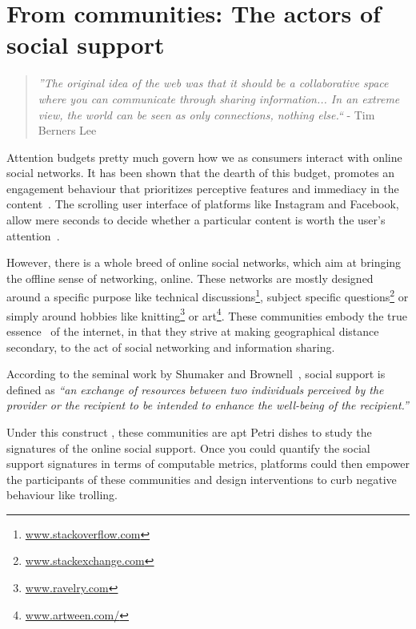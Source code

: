 
\chapter{From communities: The actors of social support }

\label{chap:Utility_support}
\graphicspath{{Chapter2/plots/} {Chapter2/plots}}
\begin{quote}
    \textit{''The original idea of the web was that it should be a collaborative space where you can communicate through sharing information... In an extreme view, the world can be seen as only connections, nothing else.``} - Tim Berners Lee\cite{berners2001weaving} 
\end{quote}
Attention budgets pretty much govern how we as consumers interact with online social networks. It has been shown that the dearth of this budget, promotes an engagement behaviour that prioritizes perceptive features and immediacy in the content~\cite{joglekar2017like}. The scrolling user interface of platforms like Instagram and Facebook, allow mere seconds to decide whether a particular content is worth the user's attention~\cite{eikelboom2017irresistible}. 

However, there is a whole breed of online social networks, which aim at bringing the offline sense of networking, online. These networks are mostly designed around a specific purpose like technical discussions\footnote{\url{www.stackoverflow.com}}, subject specific questions\footnote{\url{www.stackexchange.com}} or simply around hobbies like knitting\footnote{\url{www.ravelry.com}} or art\footnote{\url{www.artween.com/}}. These communities embody the true essence~\cite{berners2001weaving} of the internet, in that they strive at making geographical distance secondary, to the act of social networking and information sharing.
\begin{definition}
    According to the seminal work by Shumaker and Brownell~\cite{shumaker1984toward}, social support is defined as \textsl{``an exchange of resources between two individuals perceived by the provider or the recipient to be intended to enhance the well-being of the recipient.''}
    \label{def:support}
\end{definition}

Under this construct , these communities are apt Petri dishes to study the signatures of the online social support. Once you could quantify the social support signatures in terms of computable metrics, platforms could then empower the participants of these communities and design interventions to curb negative behaviour like trolling.

